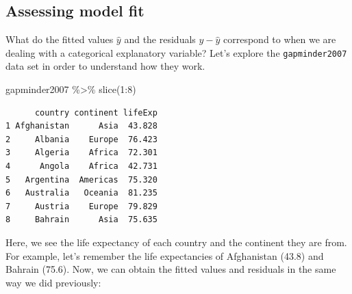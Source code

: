 \documentclass[
  letterpaper,
  DIV=11,
  numbers=noendperiod]{scrartcl}
\newenvironment{Shaded}{\begin{snugshade}}{\end{snugshade}}
\newcommand{\AttributeTok}[1]{\textcolor[rgb]{0.40,0.45,0.13}{#1}}
\newcommand{\DecValTok}[1]{\textcolor[rgb]{0.68,0.00,0.00}{#1}}
\newcommand{\FunctionTok}[1]{\textcolor[rgb]{0.28,0.35,0.67}{#1}}
\newcommand{\NormalTok}[1]{\textcolor[rgb]{0.00,0.23,0.31}{#1}}
\newcommand{\OtherTok}[1]{\textcolor[rgb]{0.00,0.23,0.31}{#1}}
\newcommand{\SpecialCharTok}[1]{\textcolor[rgb]{0.37,0.37,0.37}{#1}}
\begin{document}
\subsection{Assessing model fit}\label{assessing-model-fit-1}

What do the fitted values \(\widehat{y}\) and the residuals
\(y - \widehat{y}\) correspond to when we are dealing with a categorical
explanatory variable? Let's explore the \texttt{gapminder2007} data set
in order to understand how they work.

\begin{Shaded}
\begin{Highlighting}[]
\NormalTok{gapminder2007 }\SpecialCharTok{\%\textgreater{}\%} \FunctionTok{slice}\NormalTok{(}\DecValTok{1}\SpecialCharTok{:}\DecValTok{8}\NormalTok{)}
\end{Highlighting}
\end{Shaded}

\begin{verbatim}
      country continent lifeExp
1 Afghanistan      Asia  43.828
2     Albania    Europe  76.423
3     Algeria    Africa  72.301
4      Angola    Africa  42.731
5   Argentina  Americas  75.320
6   Australia   Oceania  81.235
7     Austria    Europe  79.829
8     Bahrain      Asia  75.635
\end{verbatim}

Here, we see the life expectancy of each country and the continent they
are from. For example, let's remember the life expectancies of
Afghanistan (43.8) and Bahrain (75.6). Now, we can obtain the fitted
values and residuals in the same way we did previously:

\begin{Shaded}
\end{Shaded}
\end{document}
